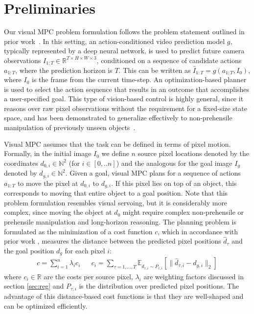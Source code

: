 \vspace{-0.1cm}
\section{Preliminaries}
\label{sec:prelim}
\vspace{-0.2cm}

Our visual MPC problem formulation follows the problem statement outlined in prior work~\cite{foresight}. In this setting, an action-conditioned video prediction model $g$, typically represented by a deep neural network, is used to predict future camera observations $\hat{I}_{1:T} \in \mathbb{R}^{T \times H\times W \times 3}$, conditioned on a sequence of candidate actions $a_{1:T}$, where the prediction horizon is $T$. This can be written as $\hat{I}_{1:T} = g(a_{1:T}, I_0)$, where $I_0$ is the frame from the current time-step. An optimization-based planner is  used to select the action sequence that results in an outcome that accomplishes a user-specified goal. This type of vision-based control is highly general, since it reasons over raw pixel observations without the requirement for a fixed-size state space, and has been demonstrated to generalize effectively to non-prehensile manipulation of previously unseen objects~\cite{foresight,sna}.

Visual MPC assumes that the task can be defined in terms of pixel motion. Formally, in the initial image $I_0$ we define $n$ source pixel locations denoted by the coordinates $d_{0,i} \in \mathbb{N}^2$ (for $i \in [0,..n]$) and the analogous for the goal image $I_g$ denoted by $d_{g,i} \in \mathbb{N}^2$. Given a goal, visual MPC plans for a sequence of actions $a_{1:T}$
to move the pixel at $d_{0,i}$ to $d_{g,i}$. If this pixel lies on top of an object, this corresponds to moving that entire object to a goal position. Note that this problem formulation resembles visual servoing, but it is considerably more complex, since moving the object at $d_0$ might require complex non-prehensile or prehensile manipulation and long-horizon reasoning.
The planning problem is formulated as the minimization of a cost function $c$, which in accordance with prior work \cite{sna}, measures the distance between the predicted pixel positions $\hat{d}_{\tau}$ and the goal position $d_g$ for each pixel $i$:
\begin{align}
c = \sum^n_{i = 1}  \lambda_i c_i && c_i = \sum_{\tau = 1, \dots, T} \mathbb{E}_{\hat{d}_{\tau,i} \sim P_{\tau,i}} \left[\|\hat{d}_{\tau,i} - d_{g,i}\|_2\right]  
\label{eq:cost}
\end{align}
where $c_i\in \mathbb{R}$ are the costs per source pixel, $\lambda_i$ are weighting factors discussed in section \ref{sec:reg} and $P_{\tau,i}$ is the distribution over predicted pixel positions. The advantage of this distance-based cost functions is that they are well-shaped and can be optimized efficiently. 

